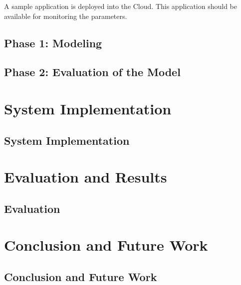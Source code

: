 \documentclass[article,type=msc,colorback,12pt,accentcolor=tud7b]{tudthesis}
\begin{document}
 	A sample application is deployed into the Cloud. This application should be available for monitoring the parameters.
 	
 	\subsection{Phase 1: Modeling}
 	
 		\subsection{Phase 2: Evaluation of the Model}

 \cleardoublepage
 \section{System Implementation}
 \subsection{System Implementation}

 \cleardoublepage	  
 \section{Evaluation and Results}	  
 \subsection{Evaluation}
 
 \cleardoublepage
 \section{Conclusion and Future Work}	  
 \subsection{Conclusion and Future Work}

\clearpage
	  

	  
\end{document}
